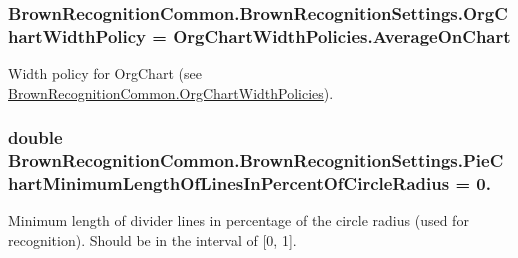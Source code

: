 \hypertarget{class_brown_recognition_common_1_1_brown_recognition_settings_a87fcc23a39461e192c45c40e6a8bb349}{
\subsubsection[{\-Org\-Chart\-Width\-Policy}]{ {\bf \-Brown\-Recognition\-Common.\-Brown\-Recognition\-Settings.\-Org\-Chart\-Width\-Policy} = \-Org\-Chart\-Width\-Policies.\-Average\-On\-Chart}}
\label{class_brown_recognition_common_1_1_brown_recognition_settings_a87fcc23a39461e192c45c40e6a8bb349}


\-Width policy for \-Org\-Chart (see \hyperlink{namespace_brown_recognition_common_a8e1f3265a68d8df8c7cc278d6c116a7d}{\-Brown\-Recognition\-Common.\-Org\-Chart\-Width\-Policies}). 

\hypertarget{class_brown_recognition_common_1_1_brown_recognition_settings_a7dc0caa3bfece8c6a17a64e2cf519e0d}{
\subsubsection[{\-Pie\-Chart\-Minimum\-Length\-Of\-Lines\-In\-Percent\-Of\-Circle\-Radius}]{\setlength{\rightskip}{0pt plus 5cm}double {\bf \-Brown\-Recognition\-Common.\-Brown\-Recognition\-Settings.\-Pie\-Chart\-Minimum\-Length\-Of\-Lines\-In\-Percent\-Of\-Circle\-Radius} = 0.}}
\label{class_brown_recognition_common_1_1_brown_recognition_settings_a7dc0caa3bfece8c6a17a64e2cf519e0d}


\-Minimum length of divider lines in percentage of the circle radius (used for recognition). \-Should be in the interval of \mbox{[}0, 1\mbox{]}. 

